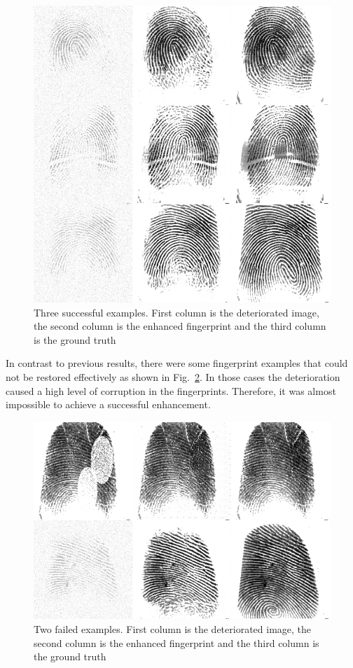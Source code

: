 \documentclass[a4paper,fleqn]{cas-dc}
\begin{document}
\begin{figure}[htbp]
\centerline{\includegraphics[scale=0.28]{figs/recons_2.png}}
\caption{Three successful examples. First column is the deteriorated image, the second column is the enhanced fingerprint and the third column is the ground truth}
\label{fig7}
\end{figure}

In contrast to previous results, there were some fingerprint examples that could not be restored effectively as shown in Fig.~\ref{fig8}. In those cases the deterioration caused a high level of corruption in the fingerprints. Therefore, it was almost impossible to achieve a successful enhancement.

\begin{figure}[htbp]
\centerline{\includegraphics[scale=0.28]{figs/recons_failed.png}}
\caption{Two failed examples. First column is the deteriorated image, the second column is the enhanced fingerprint and the third column is the ground truth}
\label{fig8}
\end{figure}
\end{document}
